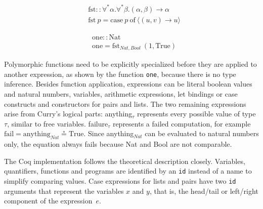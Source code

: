 \documentclass[paper = a4, fleqn, abstract=on, twoside]{scrreprt}
\newcommand{\coqinline}[1]{\texttt{#1}}
\begin{document}
\begin{figure}[H]
	\begin{minipage}{.5 \linewidth}
		\begin{align*}
		&\text{fst}::\forall^{*}\alpha.\forall^{*}\beta.(\alpha, \beta) \rightarrow\alpha\\
		&\text{fst}\: p = \text{case}\: p\: \text{of}\: \langle(u,v) \rightarrow u\rangle
		\end{align*}
	\end{minipage}
	\begin{minipage}{.5 \linewidth}
		\begin{align*}
		&\text{one} :: \text{Nat}\\
		&\text{one} = \text{fst}_{Nat, Bool} ~ (1, \text{True})
		\end{align*}
	\end{minipage}
\end{figure}\noindent
Polymorphic functions need to be explicitly specialized before they are applied to another expression, as shown by the function \texttt{one}, because there is no type inference.
Besides function application, expressions can be literal boolean values and natural numbers, variables, arithmetic expressions, let bindings or case constructs and constructors for pairs and lists. The two remaining expressions arise from Curry's logical parts: anything$_{\tau}$ represents every possible value of type $\tau$, similar to free variables. failure$_{\tau}$ represents a failed computation, for example $\text{fail} = \text{anything}_{Nat} \circeq \text{True}$. Since anything$_{Nat}$ can be evaluated to natural numbers only, the equation always fails because Nat and Bool are not comparable.
\par
The Coq implementation follows the theoretical description closely. Variables, quantifiers, functions and programs are identified by an \coqinline{id} instead of a name to simplify comparing values. Case expressions for lists and pairs have two \coqinline{id} arguments that represent the variables $x$ and $y$, that is, the head/tail or left/right component of the \mbox{expression $e$}.
\end{document}
